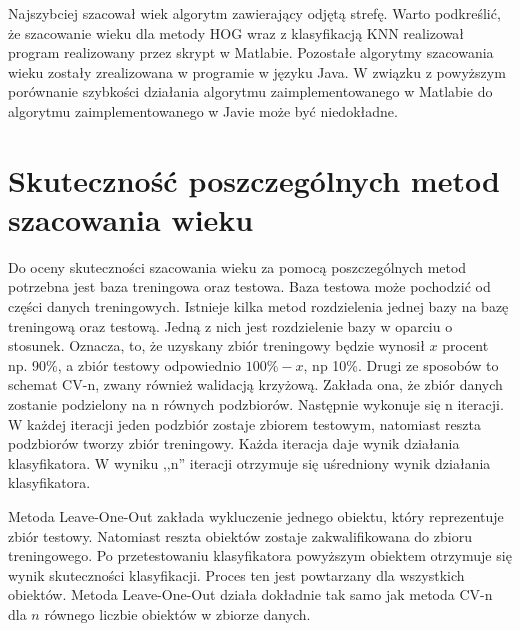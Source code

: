 \documentclass[a4paper,twoside,12pt]{book}
\begin{document}
    Najszybciej szacował wiek algorytm zawierający odjętą strefę.
    Warto podkreślić, że szacowanie wieku dla metody HOG wraz z klasyfikacją KNN realizował
    program realizowany przez skrypt w Matlabie.
    Pozostałe algorytmy szacowania wieku zostały zrealizowana w programie w języku Java.
    W związku z powyższym porównanie szybkości działania
    algorytmu zaimplementowanego w Matlabie do algorytmu zaimplementowanego w Javie może być niedokładne.



    \section{Skuteczność poszczególnych metod szacowania wieku}\label{sec:skuteczność-poszczególnych-metod-szacowania-wieku}
    Do oceny skuteczności szacowania wieku za pomocą poszczególnych metod potrzebna jest baza treningowa oraz testowa.
    Baza testowa może pochodzić od części danych treningowych. Istnieje kilka metod rozdzielenia jednej bazy na bazę
    treningową oraz testową.
    Jedną z nich jest rozdzielenie bazy w oparciu o stosunek. Oznacza, to, że uzyskany zbiór treningowy będzie wynosił
    $x$ procent np. 90\%, a zbiór testowy odpowiednio $100\% -x$, np 10\%.\cite{dataMiningAlgorithms}
    Drugi ze sposobów to schemat CV-n, zwany również walidacją krzyżową.
    Zakłada ona, że zbiór danych zostanie podzielony na n równych podzbiorów.
    Następnie wykonuje się n iteracji. W każdej iteracji jeden podzbiór zostaje zbiorem testowym, natomiast reszta
    podzbiorów tworzy zbiór treningowy.
    Każda iteracja daje wynik działania klasyfikatora. W wyniku ,,n'' iteracji otrzymuje się uśredniony wynik
    działania klasyfikatora.\cite{dataMiningAlgorithms}

    Metoda Leave-One-Out zakłada wykluczenie jednego obiektu, który reprezentuje zbiór testowy. Natomiast reszta obiektów zostaje zakwalifikowana do zbioru treningowego.
    Po przetestowaniu klasyfikatora powyższym obiektem otrzymuje się wynik skuteczności klasyfikacji. Proces ten jest powtarzany dla wszystkich obiektów.
    Metoda Leave-One-Out działa dokładnie tak samo jak metoda CV-n dla $n$ równego liczbie obiektów
    w zbiorze danych.\cite{dataMiningAlgorithms}
\end{document}
